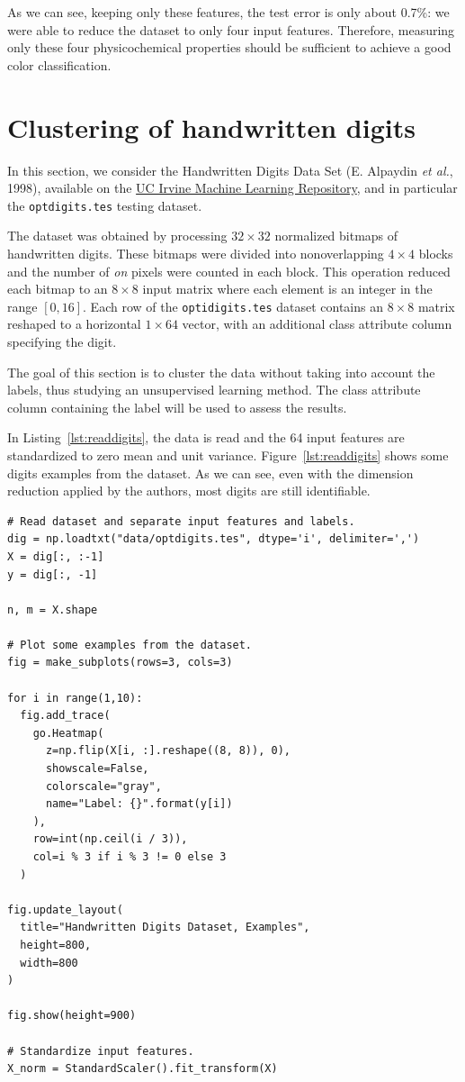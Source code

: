 \documentclass[12pt]{article}
\begin{document}
  As we can see, keeping only these features, the test error is only about
  0.7\%: we were able to reduce the dataset to only four input features.
  Therefore, measuring only these four physicochemical properties should be
  sufficient to achieve a good color classification.

  \section{Clustering of handwritten digits}

  In this section, we consider the Handwritten Digits Data Set (E. Alpaydin
  \textit{et al.}, 1998), available on the
  \href{https://archive.ics.uci.edu/ml/machine-learning-databases/optdigits/}{UC
  Irvine Machine Learning Repository}, and in particular the
  \lstinline{optdigits.tes} testing dataset.

  The dataset was obtained by processing $32 \times 32$ normalized bitmaps of
  handwritten digits. These bitmaps were divided into nonoverlapping $4 \times
  4$ blocks and the number of \textit{on} pixels were counted in each block.
  This operation reduced each bitmap to an $8 \times 8$ input matrix where each
  element is an integer in the range $[0, 16]$. Each row of the
  \lstinline{optidigits.tes} dataset contains an $8 \times 8$ matrix reshaped
  to a horizontal $1 \times 64$ vector, with an additional class attribute
  column specifying the digit.

  The goal of this section is to cluster the data without taking into account
  the labels, thus studying an unsupervised learning method. The class
  attribute column containing the label will be used to assess the results.

  In Listing~\ref{lst:readdigits}, the data is read and the 64 input features
  are standardized to zero mean and unit variance. Figure~\ref{lst:readdigits}
  shows some digits examples from the dataset. As we can see, even with the
  dimension reduction applied by the authors, most digits are still
  identifiable.

  \begin{lstlisting}[caption={Read handwritten digits dataset and display
    example images.}, captionpos=b, label={lst:readdigits}]
# Read dataset and separate input features and labels.
dig = np.loadtxt("data/optdigits.tes", dtype='i', delimiter=',')
X = dig[:, :-1]
y = dig[:, -1]

n, m = X.shape

# Plot some examples from the dataset.
fig = make_subplots(rows=3, cols=3)

for i in range(1,10):
  fig.add_trace(
    go.Heatmap(
      z=np.flip(X[i, :].reshape((8, 8)), 0),
      showscale=False,
      colorscale="gray",
      name="Label: {}".format(y[i])
    ),
    row=int(np.ceil(i / 3)),
    col=i % 3 if i % 3 != 0 else 3
  )

fig.update_layout(
  title="Handwritten Digits Dataset, Examples",
  height=800,
  width=800
)

fig.show(height=900)

# Standardize input features.
X_norm = StandardScaler().fit_transform(X)
  \end{lstlisting}
\end{document}
